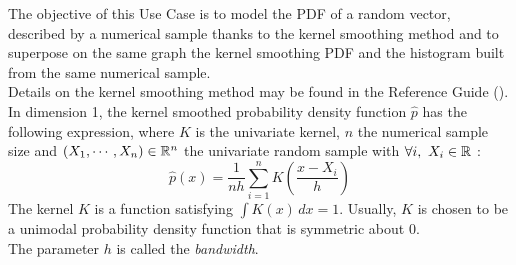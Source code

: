 \renewcommand{\filename}{docUC_InputWithData_KernelSmoothing.tex}
\renewcommand{\filetitle}{UC : PDF fitting by kernel smoothing and graphical validation : superposition of the empirical and kernel smoothing CDF}

\HeaderIIILevel



The objective of this Use Case is to model the PDF of a random  vector, described by a numerical sample thanks to the kernel smoothing method and to superpose on the same graph the kernel smoothing PDF and the histogram built from the same numerical sample.\\



Details on the kernel smoothing method may be found in the Reference Guide ().\\


In dimension 1, the kernel smoothed probability density function $\hat{p}$ has the following expression, where $K$ is the univariate kernel, $n$ the numerical sample size and $(X_1, \cdots, X_n) \in {\mathbb R}^n$ the univariate random sample with $\forall i, \, \, X_i \in {\mathbb R}$ :
\begin{equation}
  \label{kernelSmooth}
  \hat{p}(x) = \displaystyle \frac{1}{nh}\sum_{i=1}^{n} K\left(\frac{x-X_i}{h}\right)
\end{equation}
The kernel $K$ is a function satisfying $\int K(x)\, dx=1$. Usually, $K$ is chosen to be a unimodal probability density function that is symmetric about 0.\\
The parameter $h$ is called the \emph{bandwidth}.\\

